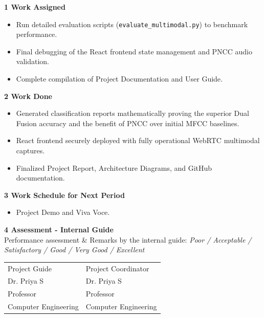 \documentclass[12pt,a4paper]{article}
\begin{document}
\noindent\textbf{1 \quad Work Assigned}
\begin{itemize}
    \item Run detailed evaluation scripts (\texttt{evaluate\_multimodal.py}) to benchmark performance.
    \item Final debugging of the React frontend state management and PNCC audio validation.
    \item Complete compilation of Project Documentation and User Guide.
\end{itemize}

\noindent\textbf{2 \quad Work Done}
\begin{itemize}
    \item Generated classification reports mathematically proving the superior Dual Fusion accuracy and the benefit of PNCC over initial MFCC baselines.
    \item React frontend securely deployed with fully operational WebRTC multimodal captures.
    \item Finalized Project Report, Architecture Diagrams, and GitHub documentation.
\end{itemize}

\noindent\textbf{3 \quad Work Schedule for Next Period}
\begin{itemize}
    \item Project Demo and Viva Voce.
\end{itemize}


\noindent\textbf{4 \quad Assessment - Internal Guide}\\[0.5em]
Performance assessment \& Remarks by the internal guide: \textit{Poor / Acceptable /}\\
\textit{Satisfactory / Good / Very Good / Excellent}\\[3em]

\noindent
\begin{tabular}{p{} p{}}
Project Guide & Project Coordinator\\[0.5em]
Dr. Priya S & Dr. Priya S\\
Professor & Professor\\
Computer Engineering & Computer Engineering\\
\end{tabular}

\vfill
\end{document}
